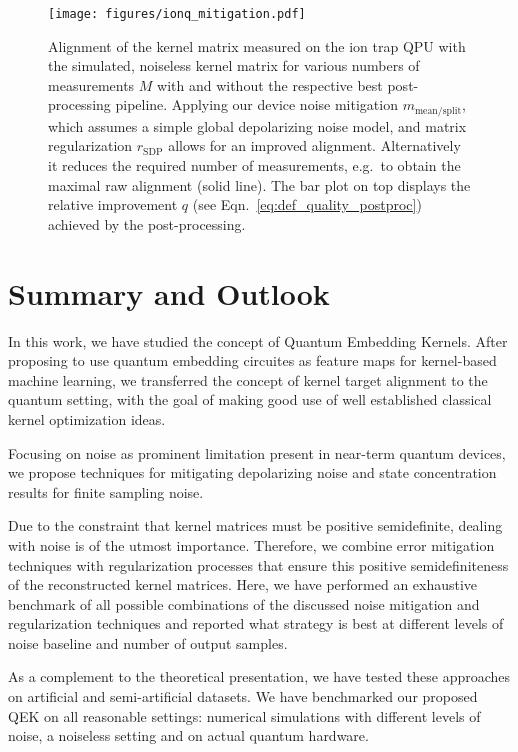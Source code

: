 \documentclass[twocolumn,superscriptaddress,nofootinbib]{revtex4-2}
\begin{document}
\begin{figure}
    \centering
    \texttt{[image: figures/ionq\_mitigation.pdf]}
    \caption{Alignment of the kernel matrix measured on the ion trap QPU with the simulated, noiseless kernel matrix for various numbers of measurements $M$ with and without the respective best post-processing pipeline.
    Applying our device noise mitigation $m_\mathrm{mean/split}$, which assumes a simple global depolarizing noise model, and matrix regularization $r_\mathrm{SDP}$ allows for an improved alignment. 
    Alternatively it reduces the required number of measurements, e.g.~to obtain the maximal raw alignment (solid line).
    The bar plot on top displays the relative improvement $q$ (see Eqn.~\eqref{eq:def_quality_postproc}) achieved by the post-processing. 
    }
    \label{fig:ionq_mitigation}
\end{figure}

\section{Summary and Outlook}
\label{sec:summary_and_outlook}

    In this work, we have studied the concept of Quantum Embedding Kernels. After proposing to use quantum embedding circuites as feature maps for kernel-based machine learning, we transferred the concept of kernel target alignment to the quantum setting, with the goal of making good use of well established classical kernel optimization ideas.
    
    Focusing on noise as prominent limitation present in near-term quantum devices, we propose techniques for mitigating depolarizing noise and state concentration results for finite sampling noise.

    Due to the constraint that kernel matrices must be positive semidefinite, dealing with noise is of the utmost importance.
    Therefore, we combine error mitigation techniques with regularization processes that ensure this positive semidefiniteness of the reconstructed kernel matrices.
    Here, we have performed an exhaustive benchmark of all possible combinations of the discussed noise mitigation and regularization techniques and reported what strategy is best at different levels of noise baseline and number of output samples.
    
    As a complement to the theoretical presentation, we have tested these approaches on artificial and semi-artificial datasets.
    We have benchmarked our proposed \ac{QEK} on all reasonable settings: numerical simulations with different levels of noise, a noiseless setting and on actual quantum hardware.
\end{document}
